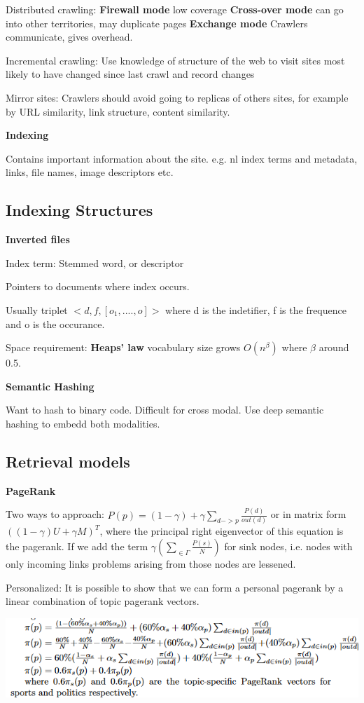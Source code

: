 \documentclass[a4paper,10pt,landscape]{article}
\newcommand{\topic}[1]{\begin{center}\section*{#1}\end{center}}
\begin{document}
\begin{multicols}{3}
Distributed crawling: \textbf{Firewall mode} low coverage \textbf{Cross-over mode} can go into other territories, may duplicate pages \textbf{Exchange mode} Crawlers communicate, gives overhead.

Incremental crawling: Use knowledge of structure of the web to visit sites most likely to have changed since last crawl and record changes

Mirror sites: Crawlers should avoid going to replicas of others sites, for example by URL similarity, link structure, content similarity.

\textbf{Indexing}

Contains important information about the site. e.g. nl index terms and metadata, links, file names, image descriptors etc.

\topic{Indexing Structures}

\textbf{Inverted files}

Index term: Stemmed word, or descriptor

Pointers to documents where index occurs.

Usually triplet $<d,f,[o_1,....,o]>$ where d is the indetifier, f is the frequence and o is the occurance.

Space requirement: \textbf{Heaps' law} vocabulary size grows $O(n^{\beta})$ where $\beta$ around 0.5.

\textbf{Semantic Hashing}

Want to hash to binary code. Difficult for cross modal. Use deep semantic hashing to embedd both modalities.

\topic{Retrieval models}

\textbf{PageRank}

Two ways to approach: $P(p) = (1-\gamma)+\gamma\sum_{d->p}\frac{P(d)}{out(d)}$ or in matrix form $((1-\gamma)U + \gamma M)^T$, where the principal right eigenvector of this equation is the pagerank.
If we add the term $\gamma(\sum_{\in\Gamma}\frac{P(s)}{N})$ for sink nodes, i.e. nodes with only incoming links problems arising from those nodes are lessened.

Personalized: It is possible to show that we can form a personal pagerank by a linear combination of topic pagerank vectors.

\includegraphics[width=\linewidth]{images/pagerank.png}


\end{multicols}
\end{document}
